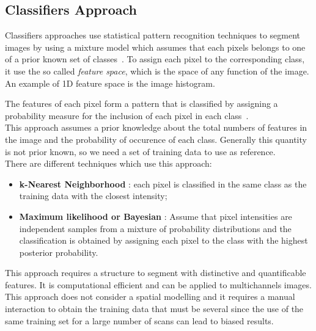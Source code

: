 \documentclass{standalone}
\begin{document}
\subsection{Classifiers Approach}

Classifiers approaches use statistical pattern recognition techniques to segment images by using a mixture model which assumes that each pixels belongs to one of a prior known set of classes~\cite{INP:Withey}. To assign each pixel to the corresponding class, it use the so called \emph{feature space}, which is the space of any function of the image. An example of 1D feature space is the image histogram. 

The features of each pixel form a pattern that is classified by assigning a probability measure for the inclusion of each pixel in each class~\cite{INP:Withey}.\\
This approach assumes a prior knowledge about the total numbers of features in the image and the probability of occurence of each class. Generally this quantity is not prior known, so we need a set of training data to use as reference. \\
There are different techniques which use this approach: 
\begin{itemize}

\item \textbf{k-Nearest Neighborhood} : each pixel is classified in the same class as the training data with the closest intensity; 

\item \textbf{Maximum likelihood or Bayesian} : Assume that pixel intensities are independent samples from a mixture of probability distributions and the  classification is obtained by assigning each pixel to the class with the highest posterior probability. 
\end{itemize}

This approach requires a structure to segment with distinctive and quantificable features. It is computational efficient and can be applied to multichannels images. 
This approach does not consider a spatial modelling and it requires a manual interaction to obtain the training data that must be several since the use of the same training set for a large number of scans can lead to biased results.  
\end{document}
